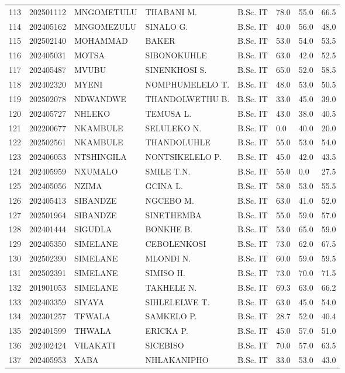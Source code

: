 \documentclass[12pt]{article}
\begin{document}
\begin{longtable}{@{}llllllll@{}}
113 & 202501112 & MNGOMETULU & THABANI M. & B.Sc. IT & 78.0 & 55.0 & 66.5 \\
114 & 202405162 & MNGOMEZULU & SINALO G. & B.Sc. IT & 40.0 & 56.0 & 48.0 \\
115 & 202502140 & MOHAMMAD & BAKER & B.Sc. IT & 53.0 & 54.0 & 53.5 \\
116 & 202405031 & MOTSA & SIBONOKUHLE & B.Sc. IT & 63.0 & 42.0 & 52.5 \\
117 & 202405487 & MVUBU & SINENKHOSI S. & B.Sc. IT & 65.0 & 52.0 & 58.5 \\
118 & 202402320 & MYENI & NOMPHUMELELO T. & B.Sc. IT & 48.0 & 53.0 & 50.5 \\
119 & 202502078 & NDWANDWE & THANDOLWETHU B. & B.Sc. IT & 33.0 & 45.0 & 39.0 \\
120 & 202405727 & NHLEKO & TEMUSA L. & B.Sc. IT & 43.0 & 38.0 & 40.5 \\
121 & 202200677 & NKAMBULE & SELULEKO N. & B.Sc. IT & 0.0 & 40.0 & 20.0 \\
122 & 202502561 & NKAMBULE & THANDOLUHLE & B.Sc. IT & 55.0 & 53.0 & 54.0 \\
123 & 202406053 & NTSHINGILA & NONTSIKELELO P. & B.Sc. IT & 45.0 & 42.0 & 43.5 \\
124 & 202405959 & NXUMALO & SMILE T.N. & B.Sc. IT & 55.0 & 0.0 & 27.5 \\
125 & 202405056 & NZIMA & GCINA L. & B.Sc. IT & 58.0 & 53.0 & 55.5 \\
126 & 202405413 & SIBANDZE & NGCEBO M. & B.Sc. IT & 63.0 & 41.0 & 52.0 \\
127 & 202501964 & SIBANDZE & SINETHEMBA & B.Sc. IT & 55.0 & 59.0 & 57.0 \\
128 & 202401444 & SIGUDLA & BONKHE B. & B.Sc. IT & 53.0 & 65.0 & 59.0 \\
129 & 202405350 & SIMELANE & CEBOLENKOSI & B.Sc. IT & 73.0 & 62.0 & 67.5 \\
130 & 202502390 & SIMELANE & MLONDI N. & B.Sc. IT & 60.0 & 59.0 & 59.5 \\
131 & 202502391 & SIMELANE & SIMISO H. & B.Sc. IT & 73.0 & 70.0 & 71.5 \\
132 & 201901053 & SIMELANE & TAKHELE N. & B.Sc. IT & 69.3 & 63.0 & 66.2 \\
133 & 202403359 & SIYAYA & SIHLELELWE T. & B.Sc. IT & 63.0 & 45.0 & 54.0 \\
134 & 202301257 & TFWALA & SAMKELO P. & B.Sc. IT & 28.7 & 52.0 & 40.4 \\
135 & 202401599 & THWALA & ERICKA P. & B.Sc. IT & 45.0 & 57.0 & 51.0 \\
136 & 202402424 & VILAKATI & SICEBISO & B.Sc. IT & 70.0 & 57.0 & 63.5 \\
137 & 202405953 & XABA & NHLAKANIPHO & B.Sc. IT & 33.0 & 53.0 & 43.0 \\


\end{longtable}
\end{document}
